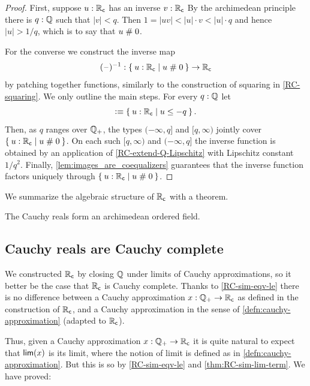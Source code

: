 \begin{proof}
  First, suppose $u : \mathbb{R}_\mathsf{c}$ has an inverse $v : \mathbb{R}_\mathsf{c}$ By the archimedean principle there is $q :
  \mathbb{Q}$ such that $|v| < q$. Then $1 = |u v| < |u| \cdot v < |u| \cdot q$ and hence $|u| >
  1/q$, which is to say that $u \mathrel{\#} 0$.

  For the converse we construct the inverse map
  \begin{equation*}
    ({\blank})^{-1} : \setof{ u : \RC | u \apart 0 } \to \RC
  \end{equation*}
  by patching together functions, similarly to the construction of squaring in
  \cref{RC-squaring}. We only outline the main steps. For every $q : \mathbb{Q}$ let
  \begin{equation*}
    [q, \infty) \defeq \setof{u : \RC | q \leq u}
    \qquad\text{and}\qquad
    (-\infty, q] \defeq \setof{u : \RC | u \leq -q}.
  \end{equation*}
  Then, as $q$ ranges over $\mathbb{Q}_{+}$, the types $(-\infty, q]$ and $[q, \infty)$ jointly cover
  $\setof{u : \RC | u \apart 0}$. On each such $[q, \infty)$ and $(-\infty, q]$ the
  inverse function is obtained by an application of \cref{RC-extend-Q-Lipschitz}
  with Lipschitz constant $1/q^2$. Finally, \cref{lem:images_are_coequalizers}
  guarantees that the inverse function factors uniquely through $\setof{ u : \RC | u
    \apart 0 }$.
\end{proof}

We summarize the algebraic structure of $\mathbb{R}_\mathsf{c}$ with a theorem.

\begin{thm} \label{RC-archimedean-ordered-field}
  The Cauchy reals form an archimedean ordered field.
\end{thm}

\subsection{Cauchy reals are Cauchy complete}
\label{sec:cauchy-reals-cauchy-complete}

We constructed $\mathbb{R}_\mathsf{c}$ by closing $\mathbb{Q}$ under limits of Cauchy approximations, so it better
be the case that $\mathbb{R}_\mathsf{c}$ is Cauchy complete. Thanks to \cref{RC-sim-eqv-le} there is no
difference between a Cauchy approximation $x : \mathbb{Q}_{+} \to \mathbb{R}_\mathsf{c}$ as defined in the construction
of $\mathbb{R}_\mathsf{c}$, and a Cauchy approximation in the sense of \cref{defn:cauchy-approximation}
(adapted to $\mathbb{R}_\mathsf{c}$).

Thus, given a Cauchy approximation $x : \mathbb{Q}_{+} \to \mathbb{R}_\mathsf{c}$ it is quite natural to expect that
$\mathsf{lim}(x)$ is its limit, where the notion of limit is defined as in
\cref{defn:cauchy-approximation}. But this is so by \cref{RC-sim-eqv-le} and
\cref{thm:RC-sim-lim-term}. We have proved:

